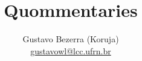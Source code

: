 \documentclass{article}
\title{Quommentaries}
\author{
    Gustavo Bezerra (Koruja)\\
    \href{mailto:gustavowl@lcc.ufrn.br}{gustavowl@lcc.ufrn.br}
}
\begin{document}
	\maketitle

	\tableofcontents
	\pagebreak

	
	
	
	
	
	
	
\end{document}
